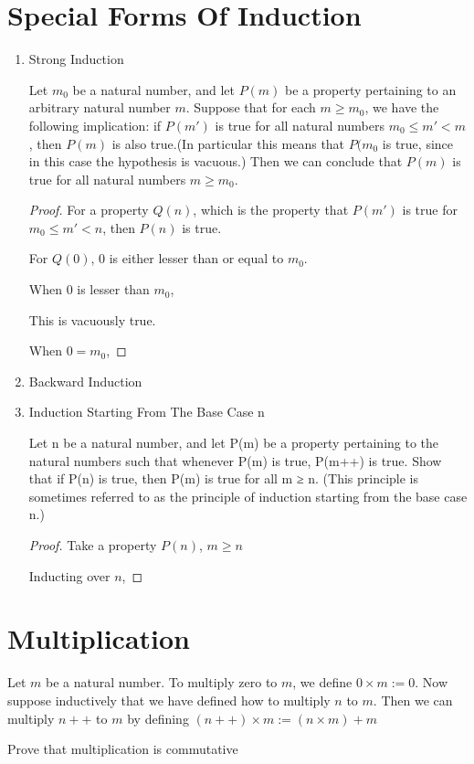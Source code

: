 \documentclass[11pt]{report}
\begin{document}
\section{Special Forms Of Induction}
\label{sec:org928268e}
\begin{enumerate}
\item Strong Induction
\label{sec:org7e7a1ea}
\begin{theorem}
Let \(m_0\) be a natural number, and let \(P(m)\) be a property pertaining to an arbitrary natural number \(m\). Suppose that for each \(m \geq m_0\), we have the following implication: if \(P(m')\) is true for all natural numbers \(m_0 \leq m' < m\), then \(P(m)\) is also true.(In particular this means that \(P(m_0\) is true, since in this case the hypothesis is vacuous.) Then we can conclude that \(P(m)\) is true for all natural numbers \(m \geq m_0\).
\end{theorem}
\begin{proof}
For a property \(Q(n)\), which is the property that \(P(m')\) is true for \(m_0 \leq m' < n\), then \(P(n)\) is true.

For \(Q(0)\),
\(0\) is either lesser than or equal to \(m_0\).

When \(0\) is lesser than \(m_0\),

This is vacuously true.

When \(0 = m_0\),
\end{proof}
\item Backward Induction
\label{sec:org6b2e286}
\item Induction Starting From The Base Case n
\label{sec:orgfc50ed9}
\begin{proposition}
Let n be a natural number, and let P(m) be a property pertaining to the natural numbers such that whenever P(m) is true, P(m++) is true. Show that if P(n) is true, then P(m) is true for all m ≥ n. (This principle is sometimes referred to as the principle of induction starting from the base case n.)
\end{proposition}
\begin{proof}
Take a property \(P(n)\), \(m \geq n\)

Inducting over \(n\),
\end{proof}
\end{enumerate}
\section{Multiplication}
\label{sec:org7522330}
\begin{definition}
Let \(m\) be a natural number. To multiply zero to \(m\), we define \(0 \times m := 0\). Now suppose inductively that we have defined how to multiply \(n\) to \(m\). Then we can multiply \(n++\) to \(m\) by defining \((n++) \times m := (n \times m) + m\)
\end{definition}
\begin{lemma}
Prove that multiplication is commutative
\end{lemma}
\end{document}
